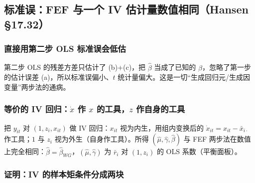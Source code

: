 \subsection{标准误：FEF 与一个 IV 估计量数值相同（Hansen §17.32）}

\subsubsection{直接用第二步 OLS 标准误会低估}

\begin{note}
第二步 OLS 的残差方差只估计了 (b)+(c)，把 $\hat\beta$ 当成了已知的 $\beta$，忽略了第一步的估计误差 (a)，所以标准误偏小、$t$ 统计量偏大。这是一切“生成回归元/生成因变量”两步法的通病。
\end{note}

\subsubsection{等价的 IV 回归：\texorpdfstring{$\dot x$}{x-dot} 作 \texorpdfstring{$x$}{x} 的工具，\texorpdfstring{$z$}{z} 作自身的工具}

\begin{thm}\label{thm:U11b-fefiv-eq}
把 $y_{it}$ 对 $(1,z_i,x_{it})$ 做 IV 回归：$x_{it}$ 视为内生，用组内变换后的 $\dot x_{it}=x_{it}-\bar x_{i\cdot}$ 作工具；$1$ 与 $z_i$ 视为外生（自身作工具）。所得 $(\hat\mu,\hat\gamma,\hat\beta)$ 与 FEF 两步法在数值上完全相同：$\hat\beta=\hat\beta_{WG}$，$(\hat\mu,\hat\gamma)$ 为 $\bar r_i$ 对 $(1,z_i)$ 的 OLS 系数（平衡面板）。
\end{thm}

\subsubsection{证明：IV 的样本矩条件分成两块}

